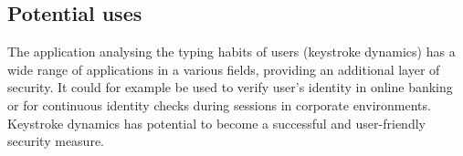\subsection{Potential uses}
The application analysing the typing habits of users (keystroke dynamics) has a wide range of applications in a various fields, providing an additional layer of security. It could for example be used to verify user's identity in online banking or for continuous identity checks during sessions in corporate environments. Keystroke dynamics has potential to become a successful and user-friendly security measure.

